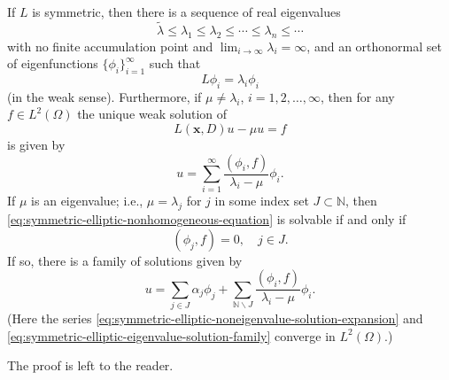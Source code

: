 \begin{Theorem}
\label{thm:symmetric-elliptic-eigenfunction-expansions}
If $L$ is symmetric, then there is a sequence of real eigenvalues
\begin{equation}\label{eq:symmetric-elliptic-eigenvalue-sequence}
\widetilde\lambda\leq\lambda_1\leq\lambda_2\leq\cdots\leq\lambda_n\leq\cdots
\end{equation}
with no finite accumulation point and $\lim_{i\to\infty}\lambda_i=\infty$, and an orthonormal set of eigenfunctions $\{\phi_i\}_{i=1}^\infty$ such that
\begin{equation}\label{eq:symmetric-elliptic-eigenfunction-equations}
L\phi_i=\lambda_i\phi_i
\end{equation}
(in the weak sense). Furthermore, if $\mu\ne\lambda_i$, $i=1,2,\ldots,\infty$, then for any $f\in L^2(\Omega)$ the unique weak solution of
\begin{equation}\label{eq:symmetric-elliptic-nonhomogeneous-equation}
L(\bm{x},D)u-\mu u=f
\end{equation}
is given by
\begin{equation}\label{eq:symmetric-elliptic-noneigenvalue-solution-expansion}
u=\sum_{i=1}^\infty\dfrac{(\phi_i,f)}{\lambda_i-\mu}\phi_i.
\end{equation}
If $\mu$ is an eigenvalue; i.e., $\mu=\lambda_j$ for $j$ in some index set $J\subset\mathbb{N}$, then \eqref{eq:symmetric-elliptic-nonhomogeneous-equation} is solvable if and only if
\begin{equation}\label{eq:symmetric-elliptic-eigenvalue-compatibility}
(\phi_j,f)=0,\quad j\in J.
\end{equation}
If so, there is a family of solutions given by
\begin{equation}\label{eq:symmetric-elliptic-eigenvalue-solution-family}
u=\sum_{j\in J}\alpha_j\phi_j+\sum_{\mathbb{N}\backslash J}\dfrac{(\phi_i,f)}{\lambda_i-\mu}\phi_i.
\end{equation}
(Here the series \eqref{eq:symmetric-elliptic-noneigenvalue-solution-expansion} and \eqref{eq:symmetric-elliptic-eigenvalue-solution-family} converge in $L^2(\Omega)$.)
\end{Theorem}

The proof is left to the reader.
